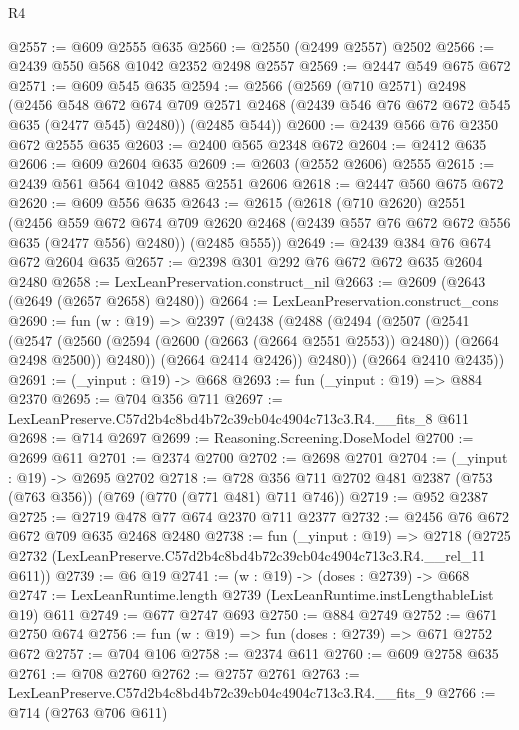 \begin{lexlean}{R4}
\begin{coremodule}
@2557 := @609 @2555 @635
@2560 := @2550 (@2499 @2557) @2502
@2566 := @2439 @550 @568 @1042 @2352 @2498 @2557
@2569 := @2447 @549 @675 @672
@2571 := @609 @545 @635
@2594 := @2566
    (@2569
      (@710 @2571)
      @2498
      (@2456
        @548
        @672
        @674
        @709
        @2571
        @2468
        (@2439 @546 @76 @672 @672 @545 @635 (@2477 @545) @2480))
      (@2485 @544))
@2600 := @2439 @566 @76 @2350 @672 @2555 @635
@2603 := @2400 @565 @2348 @672
@2604 := @2412 @635
@2606 := @609 @2604 @635
@2609 := @2603 (@2552 @2606) @2555
@2615 := @2439 @561 @564 @1042 @885 @2551 @2606
@2618 := @2447 @560 @675 @672
@2620 := @609 @556 @635
@2643 := @2615
    (@2618
      (@710 @2620)
      @2551
      (@2456
        @559
        @672
        @674
        @709
        @2620
        @2468
        (@2439 @557 @76 @672 @672 @556 @635 (@2477 @556) @2480))
      (@2485 @555))
@2649 := @2439 @384 @76 @674 @672 @2604 @635
@2657 := @2398 @301 @292 @76 @672 @672 @635 @2604 @2480
@2658 := LexLeanPreservation.construct_nil
@2663 := @2609 (@2643 (@2649 (@2657 @2658) @2480))
@2664 := LexLeanPreservation.construct_cons
@2690 := fun (w : @19) =>
  @2397
    (@2438
      (@2488
        (@2494
          (@2507
            (@2541
              (@2547
                (@2560 (@2594 (@2600 (@2663 (@2664 @2551 @2553)) @2480)) (@2664 @2498 @2500))
                @2480))
            (@2664 @2414 @2426))
          @2480))
      (@2664 @2410 @2435))
@2691 := (_yinput : @19) -> @668
@2693 := fun (_yinput : @19) => @884 @2370
@2695 := @704 @356 @711
@2697 := LexLeanPreserve.C57d2b4c8bd4b72c39cb04c4904c713c3.R4.__fits_8 @611
@2698 := @714 @2697
@2699 := Reasoning.Screening.DoseModel
@2700 := @2699 @611
@2701 := @2374 @2700
@2702 := @2698 @2701
@2704 := (_yinput : @19) -> @2695 @2702
@2718 := @728 @356 @711 @2702 @481 @2387 (@753 (@763 @356)) (@769 (@770 (@771 @481) @711 @746))
@2719 := @952 @2387
@2725 := @2719 @478 @77 @674 @2370 @711 @2377
@2732 := @2456 @76 @672 @672 @709 @635 @2468 @2480
@2738 := fun (_yinput : @19) =>
  @2718 (@2725 @2732 (LexLeanPreserve.C57d2b4c8bd4b72c39cb04c4904c713c3.R4.__rel_11 @611))
@2739 := @6 @19
@2741 := (w : @19) -> (doses : @2739) -> @668
@2747 := LexLeanRuntime.length @2739 (LexLeanRuntime.instLengthableList @19) @611
@2749 := @677 @2747 @693
@2750 := @884 @2749
@2752 := @671 @2750 @674
@2756 := fun (w : @19) => fun (doses : @2739) => @671 @2752 @672
@2757 := @704 @106
@2758 := @2374 @611
@2760 := @609 @2758 @635
@2761 := @708 @2760
@2762 := @2757 @2761
@2763 := LexLeanPreserve.C57d2b4c8bd4b72c39cb04c4904c713c3.R4.__fits_9
@2766 := @714 (@2763 @706 @611)

\end{coremodule}
\end{lexlean}
